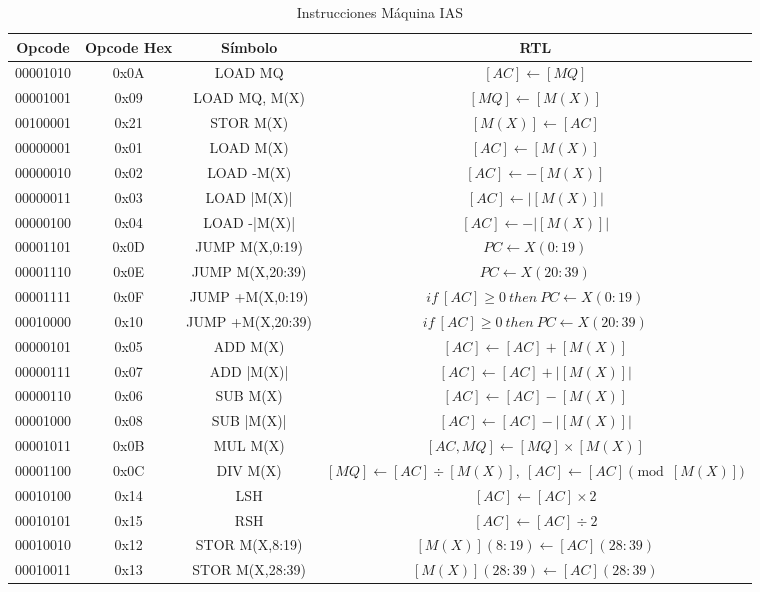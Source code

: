 \documentclass{article}
\begin{document}
\begin{table}[htbp]
  \caption{Instrucciones Máquina IAS}
  \label{tab:tablaISA-IAS}
  \centering
  \begin{tabular}{|cccc|}
    \hline
    Opcode   & Opcode Hex  &  Símbolo         & RTL \\ \hline
    00001010 & 0x0A        &  LOAD MQ         & $[AC]\leftarrow[MQ]$\\
    00001001 & 0x09        & LOAD MQ, M(X)    & $[MQ] \leftarrow [M(X)]$ \\
    00100001 & 0x21        & STOR M(X)        & $[M(X)] \leftarrow [AC]$ \\
    00000001 & 0x01        & LOAD M(X)        & $[AC] \leftarrow [M(X)]$ \\
    00000010 & 0x02        & LOAD -M(X)       & $[AC] \leftarrow -[M(X)]$ \\
    00000011 & 0x03        & LOAD |M(X)|      & $[AC] \leftarrow |[M(X)]|$ \\
    00000100 & 0x04        & LOAD -|M(X)|     & $[AC] \leftarrow -|[M(X)]|$ \\
    00001101 & 0x0D        & JUMP M(X,0:19)   & $PC \leftarrow X(0:19)$ \\
    00001110 & 0x0E        & JUMP M(X,20:39)  & $PC \leftarrow X(20:39)$ \\
    00001111 & 0x0F        & JUMP +M(X,0:19)  & $if \ [AC] \ge 0 \ then \ PC \leftarrow X(0:19)$ \\
    00010000 & 0x10        & JUMP +M(X,20:39) & $if \ [AC] \ge 0 \ then \ PC \leftarrow X(20:39)$ \\
    00000101 & 0x05        & ADD M(X)         & $[AC] \leftarrow [AC] + [M(X)]$ \\
    00000111 & 0x07        & ADD |M(X)|       & $[AC] \leftarrow [AC] + |[M(X)]|$ \\
    00000110 & 0x06        & SUB M(X)         & $[AC] \leftarrow [AC] - [M(X)]$ \\
    00001000 & 0x08        & SUB |M(X)|       & $[AC] \leftarrow [AC] - |[M(X)]|$ \\
    00001011 & 0x0B        & MUL M(X)         & $[AC, MQ] \leftarrow [MQ] \times [M(X)]$ \\
    00001100 & 0x0C        & DIV M(X)         & $[MQ] \leftarrow [AC] \div [M(X)], \ [AC] \leftarrow [AC] \pmod{[M(X)]}$ \\
    00010100 & 0x14        & LSH              & $[AC] \leftarrow [AC] \times 2$ \\
    00010101 & 0x15        & RSH              & $[AC] \leftarrow [AC] \div 2$ \\
    00010010 & 0x12        & STOR M(X,8:19)   & $[M(X)](8:19) \leftarrow [AC](28:39)$ \\
    00010011 & 0x13        & STOR M(X,28:39)  & $[M(X)](28:39) \leftarrow [AC](28:39)$ \\ 
    \hline
  \end{tabular}
\end{table}
\end{document}

